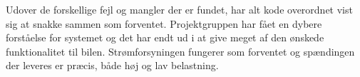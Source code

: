 Udover de forskellige fejl og mangler der er fundet, har alt kode overordnet vist sig at snakke sammen som forventet. Projektgruppen har fået en dybere forståelse for systemet og det har endt ud i at give meget af den ønskede funktionalitet til bilen.
Strømforsyningen fungerer som forventet og spændingen der leveres er præcis, både høj og lav belastning.

\clearpage